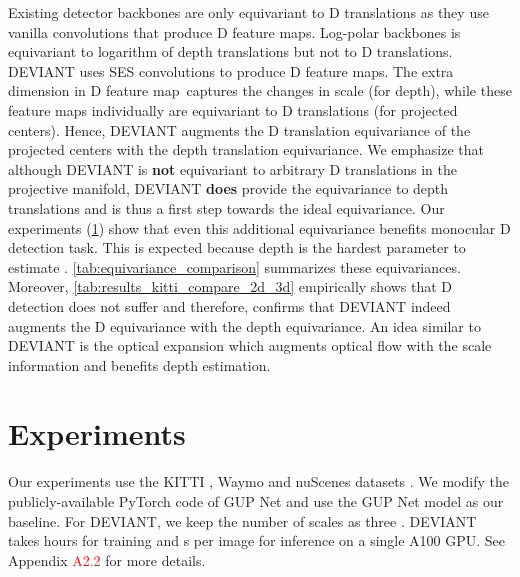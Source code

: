 \documentclass[runningheads]{llncs}
\newcommand{\twoD}{D}
\newcommand{\threeD}{D}
\newcommand{\fourD}{D}
\newcommand{\fiveD}{D}
\newcommand{\equivariant} {equivariant}
\newcommand{\equivariance}{equivariance}
\newcommand{\depthEquivariance} {depth \equivariance}
\newcommand{\ses}{SES}
\newcommand{\kitti}{KITTI}
\newcommand{\nuscenes}{nuScenes}
\newcommand{\waymo}{Waymo}
\newcommand{\gupNet}{GUP Net}
\newcommand{\refSupApp}[1]{Appendix \textcolor{red}{A#1}}
\newcommand{\methodName}{DEVIANT}
\begin{document}
            Existing detector backbones \cite{kumar2021groomed, lu2021geometry} are only \equivariant{} to \twoD{} translations as they use vanilla convolutions that produce \fourD{} feature maps. 
            Log-polar backbones is \equivariant{} to logarithm of depth translations but not 
            to \twoD{} translations.
            \methodName{} uses \ses{} convolutions to produce \fiveD{} feature maps. 
            The extra dimension in \fiveD{} feature map~captures the changes in scale (for depth), while these feature maps individually are \equivariant{} to \twoD{} translations (for projected centers).
            Hence, \methodName{} augments the \twoD{} translation \equivariance{}  of the projected  centers with the depth translation \equivariance.
            We emphasize that although \methodName{} is \textbf{not} \equivariant{} to arbitrary \threeD{} translations in the projective manifold, \methodName{} \textbf{does} provide the \equivariance{} to depth translations  and is thus a first step towards the ideal \equivariance.
            Our experiments (\cref{sec:experiments}) show that even this additional \equivariance{} benefits monocular \threeD{} detection task.
            This is expected because depth is the hardest parameter to estimate \cite{ma2021delving}.
            \cref{tab:equivariance_comparison} summarizes these \equivariance{}s.
            Moreover, \cref{tab:results_kitti_compare_2d_3d} empirically shows that \twoD{} detection does not suffer and therefore, confirms that \methodName{} indeed augments the \twoD{} \equivariance{} with the \depthEquivariance.
            An idea similar to \methodName{} is the optical expansion \cite{yang2020upgrading} which augments optical flow with the scale information and benefits depth estimation.



\section{Experiments}\label{sec:experiments}

        Our experiments use the \kitti{} \cite{geiger2012we}, \waymo{} \cite{sun2020scalability} and \nuscenes{} datasets \cite{caesar2020nuscenes}.
        We modify the publicly-available PyTorch \cite{paszke2019pytorch} code of \gupNet{} \cite{lu2021geometry} and use the \gupNet{} model as our baseline.
        For \methodName, we keep the number of scales as three \cite{sosnovik2021siamese}. 
        \methodName{} takes  hours for training and s per image for inference on a single A100 GPU.
        See \refSupApp{2.2} for more details.
\end{document}
